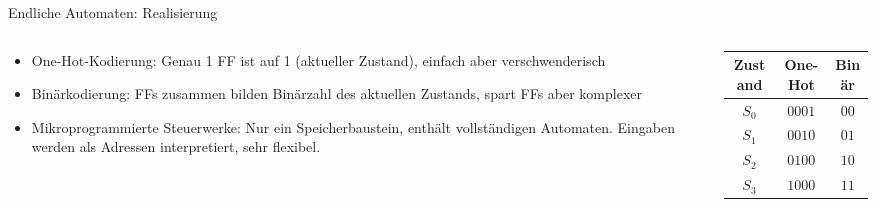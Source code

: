 \documentclass[
  german,            %
  aspectratio=169,    %
]{tumbeamer}
\begin{document}
\begin{frame}[fragile, c]{Endliche Automaten: Realisierung}{}
	\begin{columns}[c]
		\begin{column}{0.5\textwidth}
			\begin{itemize}
				\item One-Hot-Kodierung: Genau 1 FF ist auf 1 (aktueller Zustand), einfach aber verschwenderisch
				\item Binärkodierung: FFs zusammen bilden Binärzahl des aktuellen Zustands, spart FFs aber komplexer
				\item Mikroprogrammierte Steuerwerke: Nur ein Speicherbaustein, enthält vollständigen Automaten. Eingaben werden als Adressen interpretiert, sehr flexibel.
			\end{itemize}
		\end{column}
		\begin{column}{0.5\textwidth}
			\begin{table}[]
				\begin{tabular}{c|c|c}
					Zustand & One-Hot & Binär \\ \hline
					$S_0$   & $0001$              & $00$             \\
					$S_1$   & $0010$              & $01$             \\
					$S_2$   & $0100$              & $10$             \\
					$S_3$   & $1000$              & $11$
				\end{tabular}
			\end{table}
		\end{column}
	\end{columns}
\end{frame}
\end{document}
